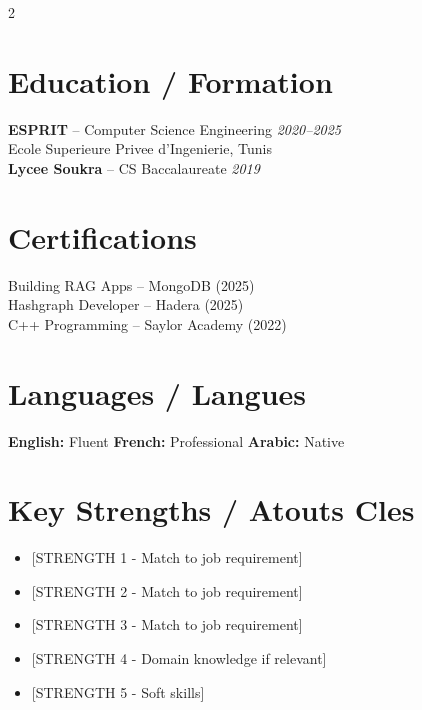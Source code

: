 \documentclass[10pt,a4paper]{article}
\begin{document}
\vspace{1pt}
\begin{multicols}{2}

\section*{Education / Formation}
{\footnotesize
\textbf{ESPRIT} -- Computer Science Engineering \hfill \textit{2020--2025}\\
Ecole Superieure Privee d'Ingenierie, Tunis\\[2pt]
\textbf{Lycee Soukra} -- CS Baccalaureate \hfill \textit{2019}
}

\vspace{-2pt}
\section*{Certifications}
{\footnotesize
Building RAG Apps -- MongoDB (2025)\\
Hashgraph Developer -- Hadera (2025)\\
C++ Programming -- Saylor Academy (2022)
}

\columnbreak

\section*{Languages / Langues}
{\footnotesize
\textbf{English:} Fluent \quad \textbf{French:} Professional \quad \textbf{Arabic:} Native
}

\vspace{-2pt}
\section*{Key Strengths / Atouts Cles}
{\footnotesize
\begin{itemize}[leftmargin=8pt,itemsep=0pt,topsep=0pt,parsep=0pt]
  \item {[STRENGTH 1 - Match to job requirement]}
  \item {[STRENGTH 2 - Match to job requirement]}
  \item {[STRENGTH 3 - Match to job requirement]}
  \item {[STRENGTH 4 - Domain knowledge if relevant]}
  \item {[STRENGTH 5 - Soft skills]}
\end{itemize}
}

\end{multicols}
\end{document}

